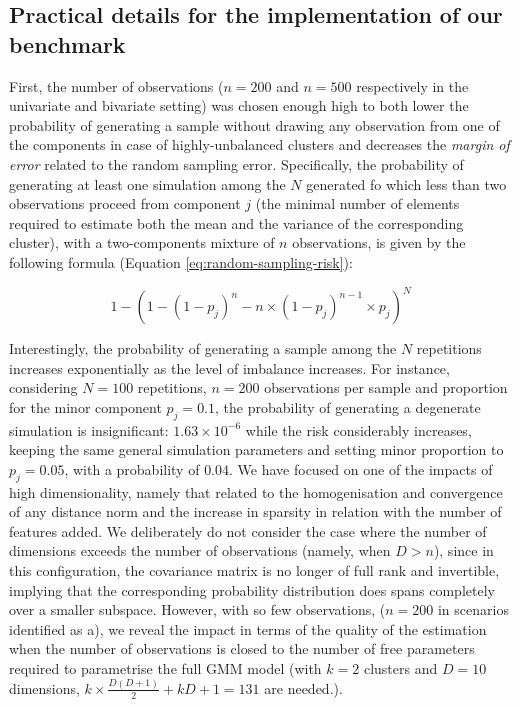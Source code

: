 \hypertarget{practical-details-for-the-implementation-of-our-benchmark}{%
\subsection{Practical details for the implementation of our benchmark}\label{practical-details-for-the-implementation-of-our-benchmark}}

\label{subsec:benchmark-details}

First, the number of observations (\(n=200\) and \(n=500\) respectively in the univariate and bivariate setting) was chosen enough high to both lower the probability of generating a sample without drawing any observation from one of the components in case of highly-unbalanced clusters and decreases the \emph{margin of error} related to the random sampling error. Specifically, the probability of generating at least one simulation among the \(N\) generated fo which less than two observations proceed from component \(j\) (the minimal number of elements required to estimate both the mean and the variance of the corresponding cluster), with a two-components mixture of \(n\) observations, is given by the following formula (Equation \eqref{eq:random-sampling-risk}):

\begin{equation}
1 - \left(1 - (1-p_j)^n - n \times (1-p_j)^{n-1}\times p_j\right)^N
\label{eq:random-sampling-risk}
\end{equation}

Interestingly, the probability of generating a sample among the \(N\) repetitions increases exponentially as the level of imbalance increases. For instance, considering \(N=100\) repetitions, \(n=200\) observations per sample and proportion for the minor component \(p_j=0.1\), the probability of generating a degenerate simulation is insignificant: \(1.63 \times 10^{-6}\) while the risk considerably increases, keeping the same general simulation parameters and setting minor proportion to \(p_j=0.05\), with a probability of \(0.04\). We have focused on one of the impacts of high dimensionality, namely that related to the homogenisation and convergence of any distance norm and the increase in sparsity in relation with the number of features added. We deliberately do not consider the case where the number of dimensions exceeds the number of observations (namely, when \(D>n\)), since in this configuration, the covariance matrix is no longer of full rank and invertible, implying that the corresponding probability distribution does spans completely over a smaller subspace. However, with so few observations, (\(n=200\) in scenarios identified as a), we reveal the impact in terms of the quality of the estimation when the number of observations is closed to the number of free parameters required to parametrise the full GMM model (with \(k=2\) clusters and \(D=10\) dimensions, \(k \times \frac{D(D+1)}{2} + kD + 1 = 131\) are needed.).

